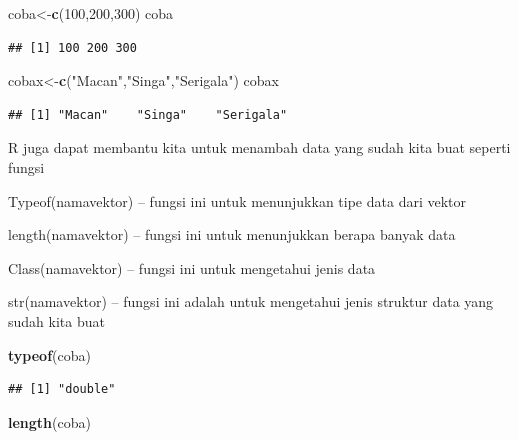 \documentclass[
]{book}
\newenvironment{Shaded}{\begin{snugshade}}{\end{snugshade}}
\newcommand{\DecValTok}[1]{\textcolor[rgb]{0.00,0.00,0.81}{#1}}
\newcommand{\FunctionTok}[1]{\textcolor[rgb]{0.13,0.29,0.53}{\textbf{#1}}}
\newcommand{\NormalTok}[1]{#1}
\newcommand{\OtherTok}[1]{\textcolor[rgb]{0.56,0.35,0.01}{#1}}
\newcommand{\StringTok}[1]{\textcolor[rgb]{0.31,0.60,0.02}{#1}}
\theoremstyle{definition}
\theoremstyle{definition}
\theoremstyle{definition}
\theoremstyle{definition}
\theoremstyle{remark}
\begin{document}
\begin{Shaded}
\begin{Highlighting}[]
\NormalTok{coba}\OtherTok{\textless{}{-}}\FunctionTok{c}\NormalTok{(}\DecValTok{100}\NormalTok{,}\DecValTok{200}\NormalTok{,}\DecValTok{300}\NormalTok{)}
\NormalTok{coba}
\end{Highlighting}
\end{Shaded}

\begin{verbatim}
## [1] 100 200 300
\end{verbatim}

\begin{Shaded}
\begin{Highlighting}[]
\NormalTok{cobax}\OtherTok{\textless{}{-}}\FunctionTok{c}\NormalTok{(}\StringTok{"Macan"}\NormalTok{,}\StringTok{"Singa"}\NormalTok{,}\StringTok{"Serigala"}\NormalTok{)}
\NormalTok{cobax}
\end{Highlighting}
\end{Shaded}

\begin{verbatim}
## [1] "Macan"    "Singa"    "Serigala"
\end{verbatim}

R juga dapat membantu kita untuk menambah data yang sudah kita buat seperti fungsi

Typeof(namavektor) -- fungsi ini untuk menunjukkan tipe data dari vektor

length(namavektor) -- fungsi ini untuk menunjukkan berapa banyak data

Class(namavektor) -- fungsi ini untuk mengetahui jenis data

str(namavektor) -- fungsi ini adalah untuk mengetahui jenis struktur data yang sudah kita buat

\begin{Shaded}
\begin{Highlighting}[]
\FunctionTok{typeof}\NormalTok{(coba)}
\end{Highlighting}
\end{Shaded}

\begin{verbatim}
## [1] "double"
\end{verbatim}

\begin{Shaded}
\begin{Highlighting}[]
\FunctionTok{length}\NormalTok{(coba)}
\end{Highlighting}
\end{Shaded}
\end{document}
